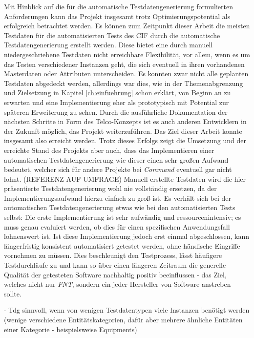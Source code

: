 Mit Hinblick auf die für die automatische Testdatengenerierung formulierten Anforderungen kann das Projekt insgesamt trotz Optimierungspotential als erfolgreich betrachtet werden. Es können zum Zeitpunkt dieser Arbeit die meisten Testdaten für die automatisierten Tests des \ac{CIF} durch die automatische Testdatengenerierung erstellt werden. Diese bietet eine durch manuell niedergeschriebene Testdaten nicht erreichbare Flexibilität, vor allem, wenn es um das Testen verschiedener Instanzen geht, die sich eventuell in ihren vorhandenen Masterdaten oder Attributen unterscheiden. Es konnten zwar nicht alle geplanten Testdaten abgedeckt werden, allerdings war dies, wie in der Themenabgrenzung und Zielsetzung in Kapitel \ref{ch:einfuehrung} schon erklärt, von Beginn an zu erwarten und eine Implementierung eher als prototypisch mit Potential zur späteren Erweiterung zu sehen. Durch die ausführliche Dokumentation der nächsten Schritte in Form des Telco-Konzepts ist es auch anderen Entwicklern in der Zukunft möglich, das Projekt weiterzuführen. Das Ziel dieser Arbeit konnte insgesamt also erreicht werden. Trotz dieses Erfolgs zeigt die Umsetzung und der erreichte Stand des Projekts aber auch, dass das Implementieren einer automatischen Testdatengenerierung wie dieser einen sehr großen Aufwand bedeutet, welcher sich für andere Projekte bei \textit{Command} eventuell gar nicht lohnt. (REFERENZ AUF UMFRAGE) Manuell erstellte Testdaten wird die hier präsentierte Testdatengenerierung wohl nie vollständig ersetzen, da der Implementierungsaufwand hierzu einfach zu groß ist. Es verhält sich bei der automatischen Testdatengenerierung etwas wie bei den automatisierten Tests selbst: Die erste Implementierung ist sehr aufwändig und ressourcenintensiv; es muss genau evaluiert werden, ob dies für einen spezifischen Anwendungsfall lohnenswert ist. Ist diese Implementierung jedoch erst einmal abgeschlossen, kann längerfristig konsistent automatisiert getestet werden, ohne händische Eingriffe vornehmen zu müssen. Dies beschleunigt den Testprozess, lässt häufigere Testdurchläufe zu und kann so über einen längeren Zeitraum die generelle Qualität der getesteten Software nachhaltig positiv beeinflussen - das Ziel, welches nicht nur \textit{FNT}, sondern ein jeder Hersteller von Software anstreben sollte.

\cite[S. 220]{witte:2019} - Tdg sinnvoll, wenn von wenigen Testdatentypen viele Instanzen benötigt werden (wenige verschiedene Entitätskategorien, dafür aber mehrere ähnliche Entitäten einer Kategorie - beispielsweise Equipments)